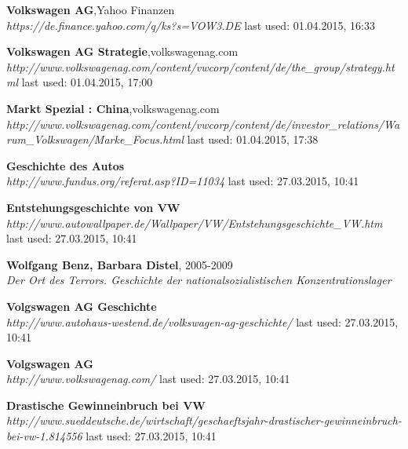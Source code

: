 \documentclass[12pt]{article}
\begin{document}
\begin{thebibliography}{56}
 \textbf{Volkswagen AG},Yahoo Finanzen \\
  \textit{  https://de.finance.yahoo.com/q/ks?s=VOW3.DE}
  \newline last used: 01.04.2015, 16:33  
  
 \textbf{Volkswagen AG Strategie},volkswagenag.com \\
  \textit{http://www.volkswagenag.com/content/vwcorp/content/de/the\_group/strategy.html}
  \newline last used: 01.04.2015, 17:00  
    
 \textbf{Markt Spezial : China},volkswagenag.com \\
  \textit{http://www.volkswagenag.com/content/vwcorp/content/de/investor\_relations/Warum\_Volkswagen/Marke\_Focus.html
}
  \newline last used: 01.04.2015, 17:38
  
  \textbf{Geschichte des Autos} \\
  \textit{
  	  http://www.fundus.org/referat.asp?ID=11034
  }
  \newline last used: 27.03.2015, 10:41
    
\textbf{Entstehungsgeschichte von VW} \\
\textit{
http://www.autowallpaper.de/Wallpaper/VW/Entstehungsgeschichte\_VW.htm
}
\newline last used: 27.03.2015, 10:41

\textbf{Wolfgang Benz, Barbara Distel}, 2005-2009 \\
\textit{
Der Ort des Terrors. Geschichte der nationalsozialistischen Konzentrationslager
}


\textbf{Volgswagen AG Geschichte} \\
\textit{
http://www.autohaus-westend.de/volkswagen-ag-geschichte/
}
\newline last used: 27.03.2015, 10:41

\textbf{Volgswagen AG} \\
\textit{
http://www.volkswagenag.com/
}
\newline last used: 27.03.2015, 10:41

\textbf{Drastische Gewinneinbruch bei VW} \\
\textit{
http://www.sueddeutsche.de/wirtschaft/geschaeftsjahr-drastischer-gewinneinbruch-bei-vw-1.814556
}
\newline last used: 27.03.2015, 10:41  


\end{thebibliography}
\end{document}
